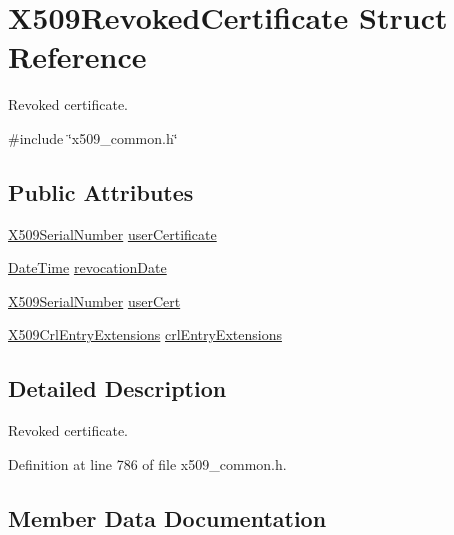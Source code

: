 \hypertarget{structX509RevokedCertificate}{}\section{X509\+Revoked\+Certificate Struct Reference}
\label{structX509RevokedCertificate}


Revoked certificate.  




{\ttfamily \#include \char`\"{}x509\+\_\+common.\+h\char`\"{}}

\subsection*{Public Attributes}
\begin{DoxyCompactItemize}
\item 
\hyperlink{structX509SerialNumber}{X509\+Serial\+Number} \hyperlink{structX509RevokedCertificate_a7bf8f4ad0c03233951e44b1c637893f3}{user\+Certificate}
\item 
\hyperlink{structDateTime}{Date\+Time} \hyperlink{structX509RevokedCertificate_aaf3268ad43d85578b8c888c85d5a9bc1}{revocation\+Date}
\item 
\hyperlink{structX509SerialNumber}{X509\+Serial\+Number} \hyperlink{structX509RevokedCertificate_a7adb683965165dfb94b8569e67ffa138}{user\+Cert}
\item 
\hyperlink{structX509CrlEntryExtensions}{X509\+Crl\+Entry\+Extensions} \hyperlink{structX509RevokedCertificate_ab4cb7aadd371dd2f55d6d89970f0210e}{crl\+Entry\+Extensions}
\end{DoxyCompactItemize}


\subsection{Detailed Description}
Revoked certificate. 

Definition at line 786 of file x509\+\_\+common.\+h.



\subsection{Member Data Documentation}
\mbox{\label{structX509RevokedCertificate_ab4cb7aadd371dd2f55d6d89970f0210e}} 
